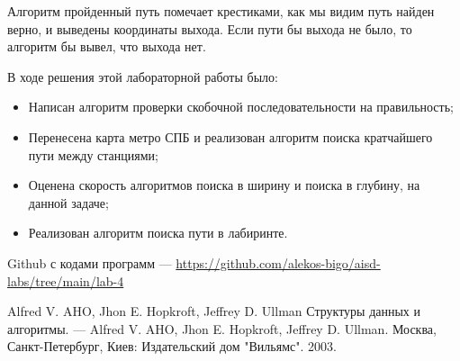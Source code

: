 \documentclass[14pt]{extreport}
\begin{document}
 Алгоритм пройденный путь помечает крестиками, как мы видим путь найден верно, и выведены координаты выхода. Если пути бы выхода не было, то алгоритм бы вывел, что выхода нет.


\newpage
{}
\conclusions

В ходе решения этой лабораторной работы было:
\begin{itemize}
    \item Написан алгоритм проверки скобочной последовательности на правильность;
    \item Перенесена карта метро СПБ и реализован алгоритм поиска кратчайшего пути между станциями;
    \item Оценена скорость алгоритмов поиска в ширину и поиска в глубину, на данной задаче;
    \item Реализован алгоритм поиска пути в лабиринте.
\end{itemize}

Github с кодами программ --- \url{https://github.com/alekos-bigo/aisd-labs/tree/main/lab-4}

\newpage
\begin{thebibliography}{99}

 Alfred V. AHO, Jhon E. Hopkroft, Jeffrey D. Ullman Структуры данных и алгоритмы. --- Alfred V. AHO, Jhon E. Hopkroft, Jeffrey D. Ullman. Москва, Санкт-Петербург, Киев: Издательский дом "Вильямс". 2003.

\end{thebibliography}
\end{document}
